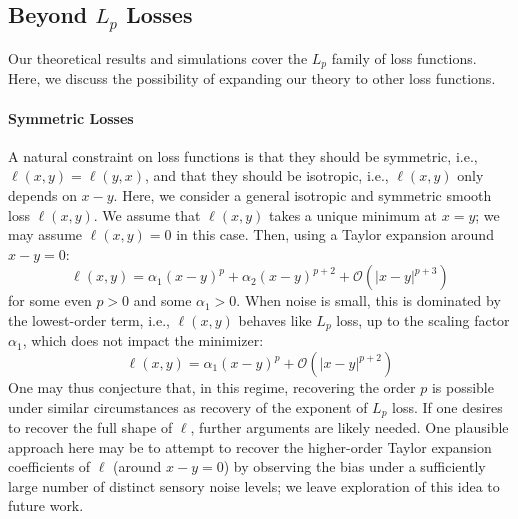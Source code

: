 \documentclass[si.tex]{subfiles}
\begin{document}



\clearpage
\newpage


\subsection{Beyond $L_p$ Losses}

Our theoretical results and simulations cover the $L_p$ family of loss functions.
Here, we discuss the possibility of expanding our theory to other loss functions.

\paragraph*{Symmetric Losses}
A natural constraint on loss functions is that they should be symmetric, i.e., $\ell(x,y) = \ell(y,x)$, and that they should be isotropic, i.e., $\ell(x,y)$ only depends on $x-y$.
Here, we consider a general isotropic and symmetric smooth loss $\ell(x,y)$. We assume that $\ell(x,y)$ takes a unique minimum at $x=y$; we may assume $\ell(x,y) = 0$ in this case.
Then, using a Taylor expansion around $x-y=0$:
\begin{equation}
\ell(x,y) = \alpha_1 (x-y)^p + \alpha_2 (x-y)^{p+2} + \mathcal{O}(|x-y|^{p+3})
\end{equation}
for some even $p>0$ and some $\alpha_1 > 0$.
When noise is small, this is dominated by the lowest-order term, i.e., $\ell(x,y)$ behaves like $L_p$ loss, up to the scaling factor $\alpha_1$, which does not impact the minimizer:
\begin{equation}\label{eq:smooth-loss-lowest-order}
\ell(x,y) = \alpha_1 (x-y)^p + \mathcal{O}(|x-y|^{p+2})
\end{equation}
One may thus conjecture that, in this regime, recovering the order $p$ is possible under similar circumstances as recovery of the exponent of $L_p$ loss.
If one desires to recover the full shape of $\ell$, further arguments are likely needed. 
One plausible approach here may be to attempt to recover the higher-order Taylor expansion coefficients of $\ell$ (around $x-y=0$) by observing the bias under a sufficiently large number of distinct sensory noise levels; we leave exploration of this idea to future work.
\end{document}
